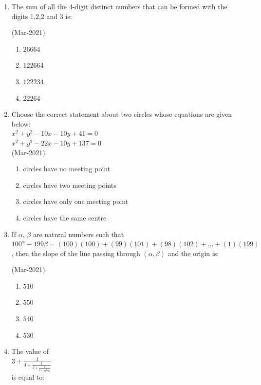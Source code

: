 \documentclass[journal,12pt,onecolumn]{IEEEtran}
\theoremstyle{remark}
\begin{document}
\begin{enumerate}
			\hfill{(Mar-2021)}
		\begin{enumerate}
    \item $ 1 $
    \item $ -1 $
    \item $ \frac{4}{5} $
    \item $ -\frac{5}{4} $
                \end{enumerate}
	\item
		The sum of all the 4-digit distinct numbers that can be formed with the digits 1,2,2 and 3 is:

			\hfill{(Mar-2021)}
		\begin{enumerate}
    \item $ 26664 $
    \item $ 122664 $
    \item $ 122234 $
    \item $ 22264 $
                \end{enumerate}
	\item
                Choose the correct statement about two circles whose equations are given below:\\
$ x^2 + y^2 - 10x - 10y + 41 = 0 $\\
$ x^2 + y^2 - 22x - 10y + 137 = 0 $\\

	\hfill{(Mar-2021)}
                \begin{enumerate}
    \item circles have no meeting point
    \item circles have two meeting points
    \item circles have only one meeting point
    \item circles have the same centre
                \end{enumerate}
	\item
                If $\alpha$, $\beta$ are natural numbers such that $100^{\alpha} - 199\beta = (100)(100) + (99)(101) + (98)(102) + \ldots + (1)(199)$, then the slope of the line passing through $(\alpha ,\beta)$ and the origin is:

			\hfill{(Mar-2021)}
                \begin{enumerate}
    \item $ 510 $
    \item $ 550 $
    \item $ 540 $
    \item $ 530 $
                \end{enumerate}
	\item
		The value of \\
		$ 3 + \frac{1}{4 + \frac{1}{3 + \frac{1}{4 + \frac{1}{3 + \ldots \infty}}}} $  \\
		is equal to:


\end{enumerate}
\end{document}
